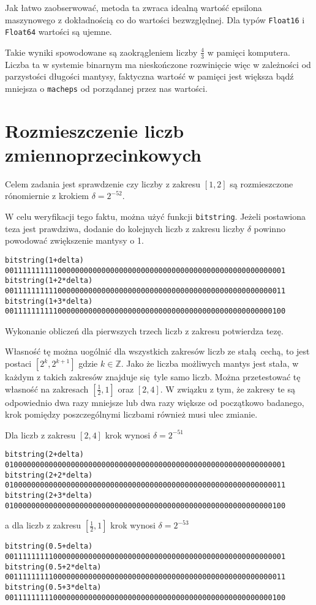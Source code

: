 \documentclass{article}
\begin{document}
Jak łatwo zaobserwować, metoda ta zwraca idealną wartość epsilona maszynowego z dokładnością co do wartości bezwzględnej.
Dla typów \texttt{Float16} i \texttt{Float64} wartości są ujemne.

Takie wyniki spowodowane są zaokrągleniem liczby $\frac{4}{3}$ w pamięci komputera.
Liczba ta w systemie binarnym ma nieskończone rozwinięcie więc w zależności od parzystości długości mantysy, faktyczna wartość w pamięci jest większa bądź mniejsza o \texttt{macheps} od porządanej przez nas wartości.

\section{Rozmieszczenie liczb zmiennoprzecinkowych}

Celem zadania jest sprawdzenie czy liczby z zakresu $[1,2]$ są rozmieszczone rónomiernie z krokiem $\delta = 2^{-52}$.

W celu weryfikacji tego faktu, można użyć funkcji \texttt{bitstring}.
Jeżeli postawiona teza jest prawdziwa, dodanie do kolejnych liczb z zakresu liczby $\delta$ powinno powodować zwiększenie mantysy o 1.

\begin{lstlisting}
bitstring(1+delta) 
0011111111110000000000000000000000000000000000000000000000000001
bitstring(1+2*delta)
0011111111110000000000000000000000000000000000000000000000000011
bitstring(1+3*delta)
0011111111110000000000000000000000000000000000000000000000000100
\end{lstlisting}

Wykonanie obliczeń dla pierwszych trzech liczb z zakresu potwierdza tezę.

Własność tę można uogólnić dla wszystkich zakresów liczb ze stałą cechą, to jest postaci $[2^k, 2^{k+1}]$ gdzie $k \in \mathbb{Z}$.
Jako że liczba możliwych mantys jest stała, w każdym z takich zakresów znajduje się tyle samo liczb.
Można przetestować tę własność na zakresach $[\frac{1}{2}, 1]$ oraz $[2, 4]$.
W związku z tym, że zakresy te są odpowiednio dwa razy mniejsze lub dwa razy większe od początkowo badanego, krok pomiędzy poszczególnymi liczbami również musi ulec zmianie.

Dla liczb z zakresu $[2,4]$ krok wynosi $\delta=2^{-51}$
\begin{lstlisting}
bitstring(2+delta) 
0100000000000000000000000000000000000000000000000000000000000001
bitstring(2+2*delta) 
0100000000000000000000000000000000000000000000000000000000000011
bitstring(2+3*delta) 
0100000000000000000000000000000000000000000000000000000000000100
\end{lstlisting}
a dla liczb z zakresu $[\frac{1}{2}, 1]$ krok wynosi $\delta=2^{-53}$
\begin{lstlisting}
bitstring(0.5+delta) 
0011111111100000000000000000000000000000000000000000000000000001
bitstring(0.5+2*delta) 
0011111111100000000000000000000000000000000000000000000000000011
bitstring(0.5+3*delta) 
0011111111100000000000000000000000000000000000000000000000000100
\end{lstlisting}
\end{document}
